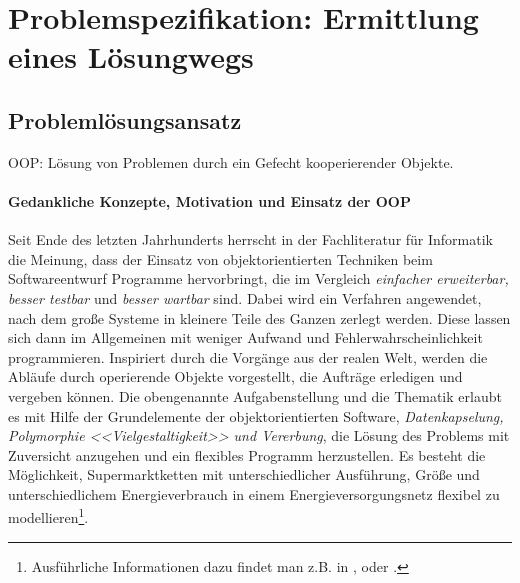\chapter{Problemspezifikation: Ermittlung eines Lösungwegs}
\label{chap:problemspezifikation}
\minitoc
\section{Problemlösungsansatz}

OOP: Lösung von Problemen durch ein Gefecht kooperierender Objekte.\cite{java}
\subsubsection*{Gedankliche Konzepte, Motivation und Einsatz der OOP}
Seit Ende des letzten Jahrhunderts herrscht in der Fachliteratur für Informatik die Meinung, dass der Einsatz von
objektorientierten Techniken beim Softwareentwurf Programme hervorbringt, die im Vergleich \textit{einfacher erweiterbar,
besser testbar} und \textit{besser wartbar} sind. Dabei wird ein Verfahren angewendet, nach
dem große Systeme in kleinere Teile des Ganzen zerlegt werden. Diese lassen sich dann im Allgemeinen mit weniger Aufwand und
Fehlerwahrscheinlichkeit programmieren. Inspiriert durch die Vorgänge aus der realen Welt, werden die Abläufe durch
operierende Objekte vorgestellt, die Aufträge erledigen und vergeben können.  Die obengenannte Aufgabenstellung und die
Thematik erlaubt es mit Hilfe der Grundelemente der objektorientierten Software,
\textit{Datenkapselung, Polymorphie <<Vielgestaltigkeit>> und Vererbung}, die Lösung des Problems mit Zuversicht anzugehen
und ein flexibles Programm herzustellen. Es besteht die Möglichkeit, Supermarktketten mit unterschiedlicher Ausführung, Größe
und unterschiedlichem Energieverbrauch in einem Energieversorgungsnetz flexibel zu modellieren\footnote{ Ausführliche
Informationen dazu findet man z.B. in \cite{OOP},\cite{java} oder \cite{python}.}.


